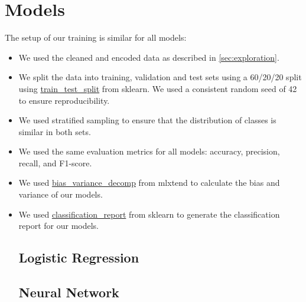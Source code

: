\section{Models}

The setup of our training is similar for all models:
\begin{itemize}
    \item We used the cleaned and encoded data as described in \ref{sec:exploration}.
    \item We split the data into training, validation and test sets using a 60/20/20 split using \href{https://scikit-learn.org/stable/modules/generated/sklearn.model_selection.train_test_split.html}{train\_test\_split} from sklearn. We used a consistent random seed of 42 to ensure reproducibility.
    \item We used stratified sampling to ensure that the distribution of classes is similar in both sets.
    \item We used the same evaluation metrics for all models: accuracy, precision, recall, and F1-score.
    \item We used \href{https://rasbt.github.io/mlxtend/user_guide/evaluate/bias_variance_decomp/}{bias\_variance\_decomp} from mlxtend to calculate the bias and variance of our models.
    \item We used \href{https://scikit-learn.org/stable/modules/generated/sklearn.metrics.classification_report.html}{classification\_report} from sklearn to generate the classification report for our models.

\subsection{Logistic Regression}

\subsection{Neural Network}


\end{itemize}
